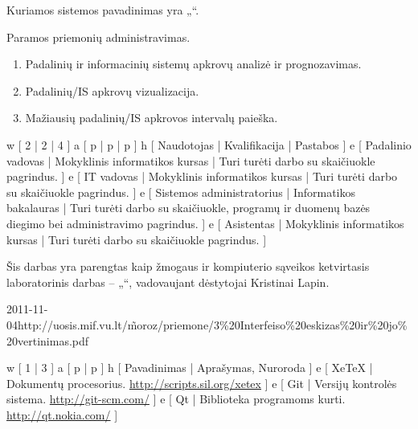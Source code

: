 Kuriamos sistemos pavadinimas yra „\systemname“.

Paramos priemonių administravimas.

\begin{enumerate}
  \item Padalinių ir informacinių sistemų apkrovų analizė ir prognozavimas.
  \item Padalinių/IS apkrovų vizualizacija.
  \item Mažiausių padalinių/IS apkrovos intervalų paieška.
\end{enumerate}

\xtable
{
  w [ 2 | 2 | 4 ]
  a [ p | p | p ]
  h [ Naudotojas | Kvalifikacija | Pastabos ]
  e [ Padalinio vadovas | Mokyklinis informatikos kursas
  | Turi turėti darbo su skaičiuokle pagrindus.
  ]
  e [ IT vadovas | Mokyklinis informatikos kursas
  | Turi turėti darbo su skaičiuokle pagrindus.
  ]
  e [ Sistemos administratorius | Informatikos bakalauras
  | Turi turėti darbo su skaičiuokle, programų ir duomenų bazės diegimo
  bei administravimo pagrindus.
  ]
  e [ Asistentas | Mokyklinis informatikos kursas
  | Turi turėti darbo su skaičiuokle pagrindus.
  ]
}

Šis darbas yra parengtas kaip žmogaus ir kompiuterio sąveikos
ketvirtasis laboratorinis darbas – „\docname“, vadovaujant
dėstytojai Kristinai Lapin.

\xdoclist
{
  {2011-11-04}{http://uosis.mif.vu.lt/\~moroz/priemone/3\%20Interfeiso\%20eskizas\%20ir\%20jo\%20vertinimas.pdf}
}

\xtableu
{
  w [ 1 | 3 ]
  a [ p | p ]
  h [ Pavadinimas | Aprašymas, Nuroroda ]
  e [ XeTeX | Dokumentų procesorius. \newline \url{http://scripts.sil.org/xetex} ]
  e [ Git | Versijų kontrolės sistema. \newline \url{http://git-scm.com/} ]
  e [ Qt | Biblioteka programoms kurti. \newline \url{http://qt.nokia.com/} ]
}

